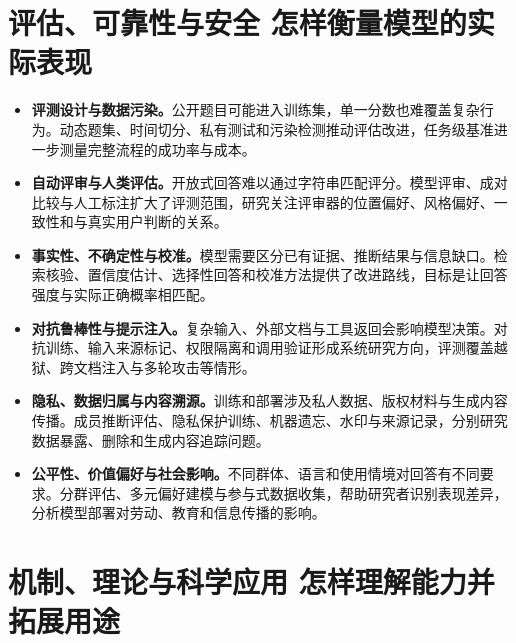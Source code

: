 \section{评估、可靠性与安全 怎样衡量模型的实际表现}

\begin{itemize}
    \item \textbf{评测设计与数据污染。}公开题目可能进入训练集，单一分数也难覆盖复杂行为。动态题集、时间切分、私有测试和污染检测推动评估改进，任务级基准进一步测量完整流程的成功率与成本。
    \item \textbf{自动评审与人类评估。}开放式回答难以通过字符串匹配评分。模型评审、成对比较与人工标注扩大了评测范围，研究关注评审器的位置偏好、风格偏好、一致性和与真实用户判断的关系。
    \item \textbf{事实性、不确定性与校准。}模型需要区分已有证据、推断结果与信息缺口。检索核验、置信度估计、选择性回答和校准方法提供了改进路线，目标是让回答强度与实际正确概率相匹配。
    \item \textbf{对抗鲁棒性与提示注入。}复杂输入、外部文档与工具返回会影响模型决策。对抗训练、输入来源标记、权限隔离和调用验证形成系统研究方向，评测覆盖越狱、跨文档注入与多轮攻击等情形。
    \item \textbf{隐私、数据归属与内容溯源。}训练和部署涉及私人数据、版权材料与生成内容传播。成员推断评估、隐私保护训练、机器遗忘、水印与来源记录，分别研究数据暴露、删除和生成内容追踪问题。
    \item \textbf{公平性、价值偏好与社会影响。}不同群体、语言和使用情境对回答有不同要求。分群评估、多元偏好建模与参与式数据收集，帮助研究者识别表现差异，分析模型部署对劳动、教育和信息传播的影响。
\end{itemize}

\section{机制、理论与科学应用 怎样理解能力并拓展用途}

